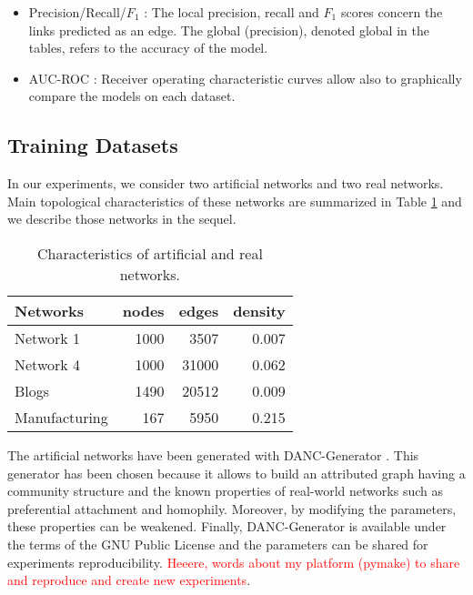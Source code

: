 \begin{itemize}

\item Precision/Recall/$F_1$ :  The local precision, recall and $F_1$ scores concern the links predicted as an edge.  The global (precision), denoted global in the tables, refers to the accuracy of the model. 
\item AUC-ROC : Receiver operating characteristic curves allow also to graphically compare the  models on each dataset.
\end{itemize}

\subsection{Training Datasets}

In our experiments, we consider two artificial networks and two real networks.  Main topological characteristics of these networks are summarized in Table \ref{table:networks_measures} and we describe those networks in the sequel.

\begin{table}[h] 
	\centering
	\caption{Characteristics of artificial and real networks.}
    \begin{tabular}{lrrr}
        \hline
        \textbf{Networks} &   nodes &   edges &   density \\
        \hline
        Network 1 &    1000 &    3507 &     0.007 \\
        Network 4 &    1000 &   31000 &     0.062 \\
        Blogs         &    1490 &   20512 &     0.009 \\
        Manufacturing &     167 &    5950 &     0.215 \\
    \hline
    \end{tabular}
	\label{table:networks_measures}
\end{table}

The artificial networks have been generated with DANC-Generator \cite{largeron2015}. This generator has been chosen because it allows to build an attributed graph having a community structure  and  the known properties of real-world networks such as preferential attachment and homophily.
Moreover, by modifying the parameters, these properties can be weakened. Finally, DANC-Generator is available under the terms of the GNU Public License and the parameters can be shared for experiments reproducibility. \textcolor{red}{Heeere, words about my platform (pymake) to share and reproduce and create new experiments}.

